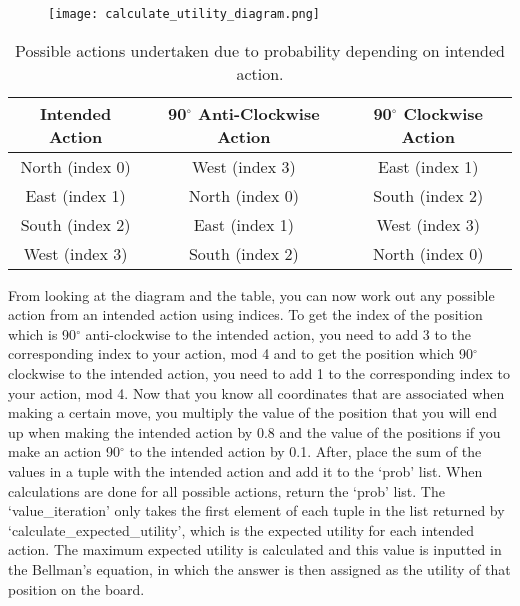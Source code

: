 \documentclass[12pt]{report}
\begin{document}
        \begin{figure}[H]
          \centering
          \texttt{[image: calculate\_utility\_diagram.png]}
        \end{figure}
        \begin{table}[H]
          \begin{center}
            \begin{tabular}{c|c|c}
              \textbf{Intended Action} & \textbf{90$^{\circ}$ Anti-Clockwise Action} & \textbf{90$^{\circ}$ Clockwise Action}\\
              \hline
              North (index 0) & West (index 3) & East (index 1)\\
              East (index 1) & North (index 0) & South (index 2)\\
              South (index 2) & East (index 1) & West (index 3)\\
              West (index 3) & South (index 2) & North (index 0)\\
            \end{tabular}
            \caption{Possible actions undertaken due to probability depending on intended action.}
            \label{tab:table1}
          \end{center}
        \end{table}
        From looking at the diagram and the table, you can now work out any possible action from an intended action using indices. To get the index of the position which is 90$^{\circ}$ anti-clockwise to the intended action, you need to add 3 to the corresponding index to your action, mod 4 and to get the position which 90$^{\circ}$ clockwise to the intended action, you need to add 1 to the corresponding index to your action, mod 4.
        \newline \newline
        Now that you know all coordinates that are associated when making a certain move, you multiply the value of the position that you will end up when making the intended action by 0.8 and the value of the positions if you make an action 90$^{\circ}$ to the intended action by 0.1. After, place the sum of the values in a tuple with the intended action and add it to the `prob' list. When calculations are done for all possible actions, return the `prob' list.
        \newline \newline
        The `value\_iteration' only takes the first element of each tuple in the list returned by `calculate\_expected\_utility', which is the expected utility for each intended action. The maximum expected utility is calculated and this value is inputted in the Bellman's equation, in which the answer is then assigned as the utility of that position on the board.
\end{document}
